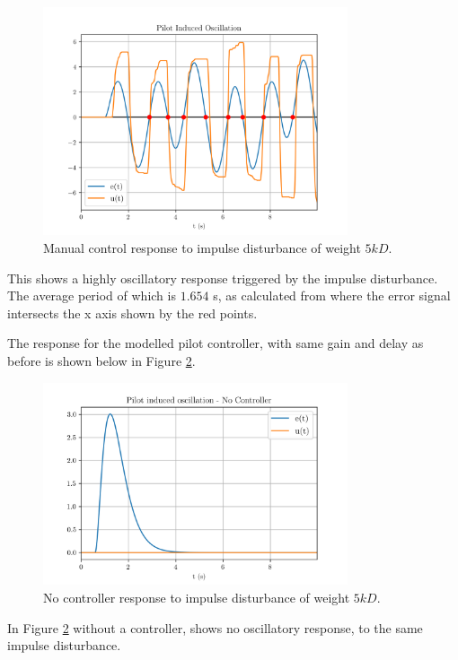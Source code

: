 \documentclass[8pt]{article}
\begin{document}
\begin{figure}[H]
    \centering
    \includegraphics[width=0.8\textwidth]{figures/FIGURE_4.png}
    \caption{Manual control response to impulse disturbance of weight $5kD$.}
    \label{fig:figure4}
\end{figure}


This shows a highly oscillatory response triggered by the impulse disturbance.
The average period of which is $1.654$ s, as calculated from where the error signal intersects the x axis shown by the red points.

The response for the modelled pilot controller, with same gain and delay as before is shown below in Figure \ref{fig:figure5}.

\begin{figure}[H]
    \centering
    \includegraphics[width=0.8\textwidth]{figures/FIGURE_5.png}
    \caption{No controller response to impulse disturbance of weight $5kD$.}
    \label{fig:figure5}
\end{figure}

In Figure \ref{fig:figure5} without a controller, shows no oscillatory response, to the same impulse disturbance.
\end{document}

